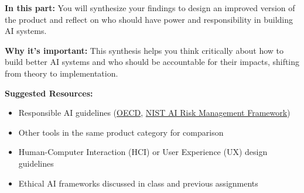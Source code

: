 \documentclass{article}
\theoremstyle{case}
\theoremstyle{definition}
\begin{document}
\textbf{In this part:} You will synthesize your findings to design an improved version of the product and reflect on who should have power and responsibility in building AI systems.

\vspace{2mm}

\textbf{Why it's important:} This synthesis helps you think critically about how to build better AI systems and who should be accountable for their impacts, shifting from theory to implementation.

\vspace{2mm}

\textbf{Suggested Resources:}
\begin{itemize}
  \item Responsible AI guidelines (\href{https://www.oecd.org/en/topics/sub-issues/ai-principles.html}{OECD}, \href{https://www.nist.gov/itl/ai-risk-management-framework}{NIST AI Risk Management Framework})
  \item Other tools in the same product category for comparison
  \item Human-Computer Interaction (HCI) or User Experience (UX) design guidelines
  \item Ethical AI frameworks discussed in class and previous assignments
\end{itemize}
\end{document}
